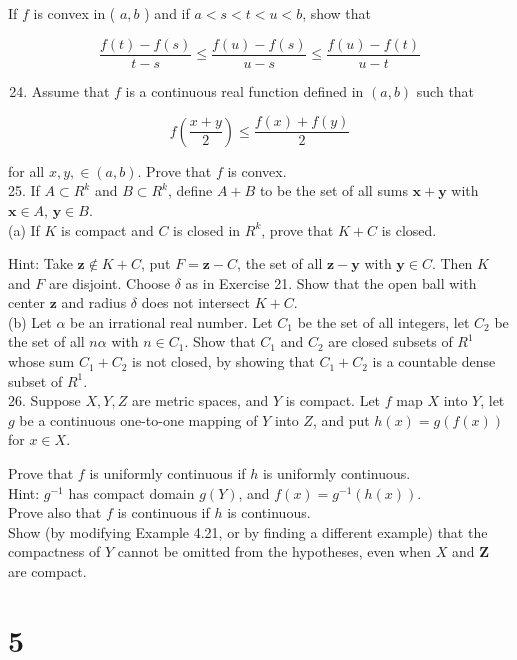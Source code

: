 \documentclass[10pt]{article}
\begin{document}
If $f$ is convex in ( $a, b$ ) and if $a<s<t<u<b$, show that

$$
\frac{f(t)-f(s)}{t-s} \leq \frac{f(u)-f(s)}{u-s} \leq \frac{f(u)-f(t)}{u-t}
$$

\begin{enumerate}
  \setcounter{enumi}{23}
  \item Assume that $f$ is a continuous real function defined in $(a, b)$ such that
\end{enumerate}

$$
f\left(\frac{x+y}{2}\right) \leq \frac{f(x)+f(y)}{2}
$$

for all $x, y, \in(a, b)$. Prove that $f$ is convex.\\
25. If $A \subset R^{k}$ and $B \subset R^{k}$, define $A+B$ to be the set of all sums $\mathbf{x}+\mathbf{y}$ with $\mathbf{x} \in A$, $\mathbf{y} \in B$.\\
(a) If $K$ is compact and $C$ is closed in $R^{k}$, prove that $K+C$ is closed.

Hint: Take $\mathbf{z} \notin K+C$, put $F=\mathbf{z}-C$, the set of all $\mathbf{z}-\mathbf{y}$ with $\mathbf{y} \in C$. Then $K$ and $F$ are disjoint. Choose $\delta$ as in Exercise 21. Show that the open ball with center $\mathbf{z}$ and radius $\delta$ does not intersect $K+C$.\\
(b) Let $\alpha$ be an irrational real number. Let $C_{1}$ be the set of all integers, let $C_{2}$ be the set of all $n \alpha$ with $n \in C_{1}$. Show that $C_{1}$ and $C_{2}$ are closed subsets of $R^{1}$ whose sum $C_{1}+C_{2}$ is not closed, by showing that $C_{1}+C_{2}$ is a countable dense subset of $R^{1}$.\\
26. Suppose $X, Y, Z$ are metric spaces, and $Y$ is compact. Let $f$ map $X$ into $Y$, let $g$ be a continuous one-to-one mapping of $Y$ into $Z$, and put $h(x)=g(f(x))$ for $x \in X$.

Prove that $f$ is uniformly continuous if $h$ is uniformly continuous.\\
Hint: $g^{-1}$ has compact domain $g(Y)$, and $f(x)=g^{-1}(h(x))$.\\
Prove also that $f$ is continuous if $h$ is continuous.\\
Show (by modifying Example 4.21, or by finding a different example) that the compactness of $Y$ cannot be omitted from the hypotheses, even when $X$ and $\boldsymbol{Z}$ are compact.

\section*{5}
\end{document}

